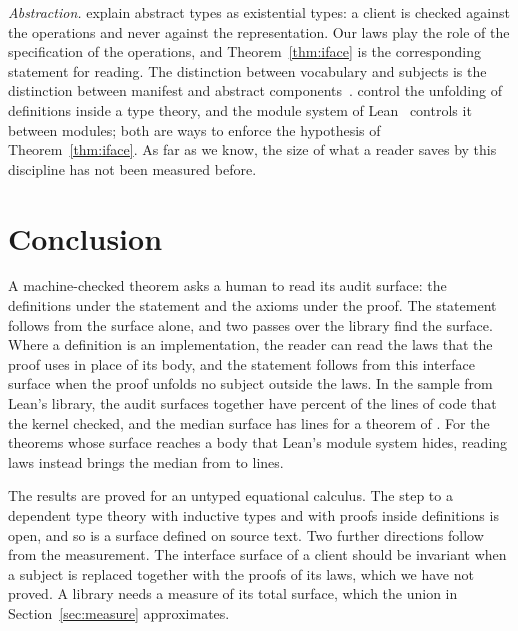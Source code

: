 \documentclass[acmsmall,nonacm,screen]{acmart}
\begin{document}
\emph{Abstraction.} \citet{mitchell1988} explain abstract types as existential types: a client
is checked against the operations and never against the representation. Our laws play the role
of the specification of the operations, and Theorem~\ref{thm:iface} is the corresponding
statement for reading. The distinction between vocabulary and subjects is the distinction
between manifest and abstract components~\citep{leroy1994}. \citet{gratzer2022} control the
unfolding of definitions inside a type theory, and the module system of
Lean~\citep{leanmodules} controls it between modules; both are ways to enforce the hypothesis
of Theorem~\ref{thm:iface}. As far as we know, the size of what a reader saves by this
discipline has not been measured before.

\section{Conclusion}
\label{sec:conclusion}

A machine-checked theorem asks a human to read its audit surface: the definitions under the
statement and the axioms under the proof. The statement follows from the surface alone, and two
passes over the library find the surface. Where a definition is an implementation, the reader
can read the laws that the proof uses in place of its body, and the statement follows from this
interface surface when the proof unfolds no subject outside the laws. In the sample from Lean's
library, the audit surfaces together have \UnionAuditPercent{} percent of the lines of code that
the kernel checked, and the median surface has \AuditLinesMedian{} lines for a theorem of
\OwnLinesMedian{}. For the theorems whose surface reaches a body that Lean's module system
hides, reading laws instead brings the median from \SubjAuditLinesMedian{} to
\SubjIfaceLinesMedian{} lines.

The results are proved for an untyped equational calculus. The step to a dependent type theory
with inductive types and with proofs inside definitions is open, and so is a surface defined on
source text. Two further directions follow from the measurement. The interface surface of a
client should be invariant when a subject is replaced together with the proofs of its laws,
which we have not proved. A library needs a measure of its total surface, which the union in
Section~\ref{sec:measure} approximates.



\end{document}
